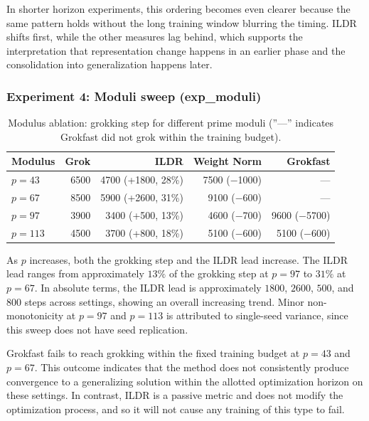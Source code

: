 \documentclass{article}
\begin{document}
\vspace{3pt}

In shorter horizon experiments, this ordering becomes even clearer because the same pattern holds without the long training window blurring the timing. ILDR shifts first, while the other measures  lag behind, which supports the interpretation that representation change happens in an earlier phase and the consolidation into generalization happens later. 









\subsubsection{Experiment 4: Moduli sweep (exp\_moduli)}
\begin{table}[H]
\centering
\begin{tabular}{lrrrr}
\hline
Modulus & Grok & ILDR & Weight Norm & Grokfast \\
\hline
$p=43$  & 6500 & 4700 (+1800, 28\%) & 7500 ($-$1000)  & --- \\
$p=67$  & 8500 & 5900 (+2600, 31\%) & 9100 ($-$600)   & --- \\
$p=97$  & 3900 & 3400 (+500, 13\%)  & 4600 ($-$700)   & 9600 ($-$5700) \\
$p=113$ & 4500 & 3700 (+800, 18\%)  & 5100 ($-$600)   & 5100 ($-$600) \\
\hline
\end{tabular}
\caption{Modulus ablation: grokking step for different prime moduli (''---'' indicates Grokfast did not grok within the training budget).}
\label{tab:modulus_ablation}
\end{table}

\vspace{3pt}


As \(p\) increases, both the grokking step and the ILDR lead increase. The ILDR lead ranges from approximately \(13\%\) of the grokking step at \(p = 97\) to \(31\%\) at \(p = 67\). In absolute terms, the ILDR lead is approximately \(1800\), \(2600\), \(500\), and \(800\) steps across settings, showing an overall increasing trend. Minor non-monotonicity at \(p = 97\) and \(p = 113\) is attributed to single-seed variance, since this sweep does not have seed replication.

\vspace{3pt}

Grokfast fails to reach grokking within the fixed training budget at \(p = 43\) and \(p = 67\). This outcome indicates that the method does not consistently produce convergence to a generalizing solution within the allotted optimization horizon on these settings. In contrast, ILDR is a passive metric and does not modify the optimization process, and so it will not cause any training of this type to fail. 
\end{document}
